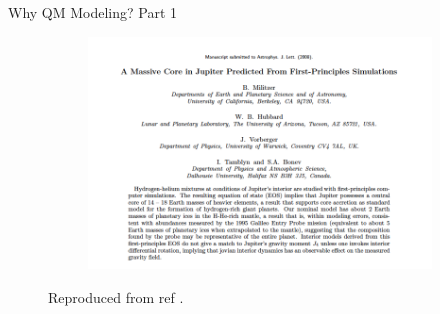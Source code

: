 \documentclass[aspectratio=169]{beamer}
\begin{document}
\begin{frame}{Why QM Modeling? Part 1}
\begin{figure}
\begin{subfigure}{0.2\textwidth}
            \end{subfigure}
            \begin{subfigure}{0.5\textwidth}
                \includegraphics[width=\linewidth]{lectures/figures/0.3_Jupiter_3.png}
            \end{subfigure}
            \caption{Reproduced from ref \cite{militzerMassiveCoreJupiter2008a}.}
        \end{figure}
    \end{frame}
\end{document}
